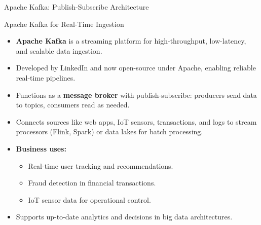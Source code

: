 \documentclass[aspectratio=169, table]{beamer}
\begin{document}
\begin{frame}{Apache Kafka: Publish-Subscribe Architecture}
\begin{figure}
{
		}
	\end{figure}
	
\end{frame}


\begin{frame}{Apache Kafka for Real-Time Ingestion}
	\vspace{20pt}
	
	\begin{itemize}
		\item \textbf{Apache Kafka} is a streaming platform for high-throughput, low-latency, and scalable data ingestion.
		
		\item Developed by LinkedIn and now open-source under Apache, enabling reliable real-time pipelines.
		
		\item Functions as a \textbf{message broker} with publish-subscribe: producers send data to topics, consumers read as needed.
		
		\item Connects sources like web apps, IoT sensors, transactions, and logs to stream processors (Flink, Spark) or data lakes for batch processing.
		
		\item \textbf{Business uses:}
		\begin{itemize}
			\item Real-time user tracking and recommendations.
			\item Fraud detection in financial transactions.
			\item IoT sensor data for operational control.
		\end{itemize}
		
		\item Supports up-to-date analytics and decisions in big data architectures.
	\end{itemize}
	
\end{frame}
\end{document}
